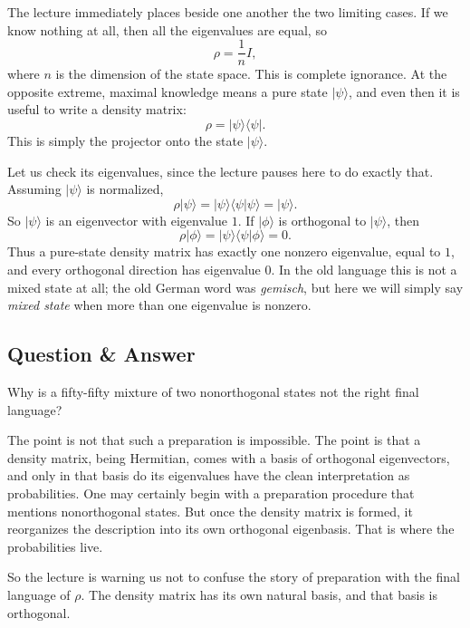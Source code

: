 The lecture immediately places beside one another the two limiting cases. If we know nothing at all, then all the eigenvalues are equal, so
\begin{equation}
\rho = \frac{1}{n}I,
\end{equation}
where \(n\) is the dimension of the state space. This is complete ignorance. At the opposite extreme, maximal knowledge means a pure state \(|\psi\rangle\), and even then it is useful to write a density matrix:
\begin{equation}
\rho = |\psi\rangle\langle\psi|.
\end{equation}
This is simply the projector onto the state \(|\psi\rangle\).

Let us check its eigenvalues, since the lecture pauses here to do exactly that. Assuming \(|\psi\rangle\) is normalized,
\begin{equation}
\rho |\psi\rangle
=
|\psi\rangle\langle\psi|\psi\rangle
=
|\psi\rangle.
\end{equation}
So \(|\psi\rangle\) is an eigenvector with eigenvalue \(1\). If \(|\phi\rangle\) is orthogonal to \(|\psi\rangle\), then
\begin{equation}
\rho|\phi\rangle
=
|\psi\rangle\langle\psi|\phi\rangle
=
0.
\end{equation}
Thus a pure-state density matrix has exactly one nonzero eigenvalue, equal to \(1\), and every orthogonal direction has eigenvalue \(0\). In the old language this is not a mixed state at all; the old German word was \emph{gemisch}, but here we will simply say \emph{mixed state} when more than one eigenvalue is nonzero.

\subsection{Question \& Answer}

Why is a fifty-fifty mixture of two nonorthogonal states not the right final language?

The point is not that such a preparation is impossible. The point is that a density matrix, being Hermitian, comes with a basis of orthogonal eigenvectors, and only in that basis do its eigenvalues have the clean interpretation as probabilities. One may certainly begin with a preparation procedure that mentions nonorthogonal states. But once the density matrix is formed, it reorganizes the description into its own orthogonal eigenbasis. That is where the probabilities live.

So the lecture is warning us not to confuse the story of preparation with the final language of \(\rho\). The density matrix has its own natural basis, and that basis is orthogonal.

